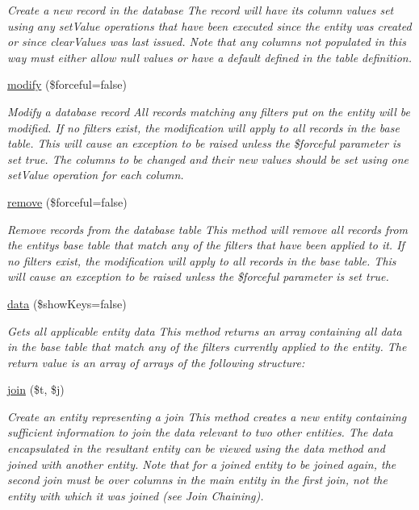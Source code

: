 \begin{DoxyCompactItemize}
\begin{DoxyCompactList}\small\item\em Create a new record in the database The record will have its column values set using any set\+Value operations that have been executed since the entity was created or since clear\+Values was last issued. Note that any columns not populated in this way must either allow null values or have a default defined in the table definition. \end{DoxyCompactList}\item 
\hyperlink{classentity_a93f973ae16957a93f792003a89a13be0}{modify} (\$forceful=false)
\begin{DoxyCompactList}\small\item\em Modify a database record All records matching any filters put on the entity will be modified. If no filters exist, the modification will apply to all records in the base table. This will cause an exception to be raised unless the \$forceful parameter is set true. The columns to be changed and their new values should be set using one set\+Value operation for each column. \end{DoxyCompactList}\item 
\hyperlink{classentity_a67aada7aaf1810524e8ae93992f2900c}{remove} (\$forceful=false)
\begin{DoxyCompactList}\small\item\em Remove records from the database table This method will remove all records from the entity\textquotesingle{}s base table that match any of the filters that have been applied to it. If no filters exist, the modification will apply to all records in the base table. This will cause an exception to be raised unless the \$forceful parameter is set true. \end{DoxyCompactList}\item 
\hyperlink{classentity_adfb66dcc511ef54670c2999d9f716eb9}{data} (\$show\+Keys=false)
\begin{DoxyCompactList}\small\item\em Gets all applicable entity data This method returns an array containing all data in the base table that match any of the filters currently applied to the entity. The return value is an array of arrays of the following structure\+: \end{DoxyCompactList}\item 
\hyperlink{classentity_a4d4ed92c955fe0e4160ae7572e693be7}{join} (\$t, \$j)
\begin{DoxyCompactList}\small\item\em Create an entity representing a join This method creates a new entity containing sufficient information to join the data relevant to two other entities. The data encapsulated in the resultant entity can be viewed using the data method and joined with another entity. Note that for a joined entity to be joined again, the second join must be over columns in the main entity in the first join, not the entity with which it was joined (see Join Chaining). \end{DoxyCompactList}\end{DoxyCompactItemize}
